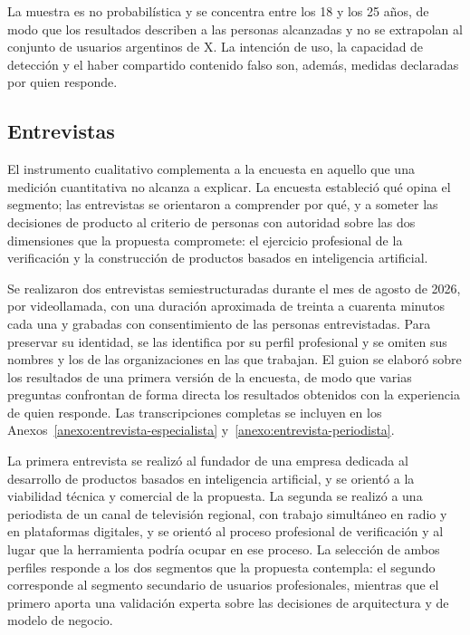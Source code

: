 La muestra es no probabilística y se concentra entre los 18 y los 25 años, de modo que los resultados describen a las personas alcanzadas y no se extrapolan al conjunto de usuarios argentinos de X. La intención de uso, la capacidad de detección y el haber compartido contenido falso son, además, medidas declaradas por quien responde.

\subsection{Entrevistas}
\label{sec:entrevistas}

El instrumento cualitativo complementa a la encuesta en aquello que una medición cuantitativa no alcanza a explicar. La encuesta estableció qué opina el segmento; las entrevistas se orientaron a comprender por qué, y a someter las decisiones de producto al criterio de personas con autoridad sobre las dos dimensiones que la propuesta compromete: el ejercicio profesional de la verificación y la construcción de productos basados en inteligencia artificial.

Se realizaron dos entrevistas semiestructuradas durante el mes de agosto de 2026, por videollamada, con una duración aproximada de treinta a cuarenta minutos cada una y grabadas con consentimiento de las personas entrevistadas. Para preservar su identidad, se las identifica por su perfil profesional y se omiten sus nombres y los de las organizaciones en las que trabajan. El guion se elaboró sobre los resultados de una primera versión de la encuesta, de modo que varias preguntas confrontan de forma directa los resultados obtenidos con la experiencia de quien responde. Las transcripciones completas se incluyen en los Anexos~\ref{anexo:entrevista-especialista} y~\ref{anexo:entrevista-periodista}.

La primera entrevista se realizó al fundador de una empresa dedicada al desarrollo de productos basados en inteligencia artificial, y se orientó a la viabilidad técnica y comercial de la propuesta. La segunda se realizó a una periodista de un canal de televisión regional, con trabajo simultáneo en radio y en plataformas digitales, y se orientó al proceso profesional de verificación y al lugar que la herramienta podría ocupar en ese proceso. La selección de ambos perfiles responde a los dos segmentos que la propuesta contempla: el segundo corresponde al segmento secundario de usuarios profesionales, mientras que el primero aporta una validación experta sobre las decisiones de arquitectura y de modelo de negocio.

